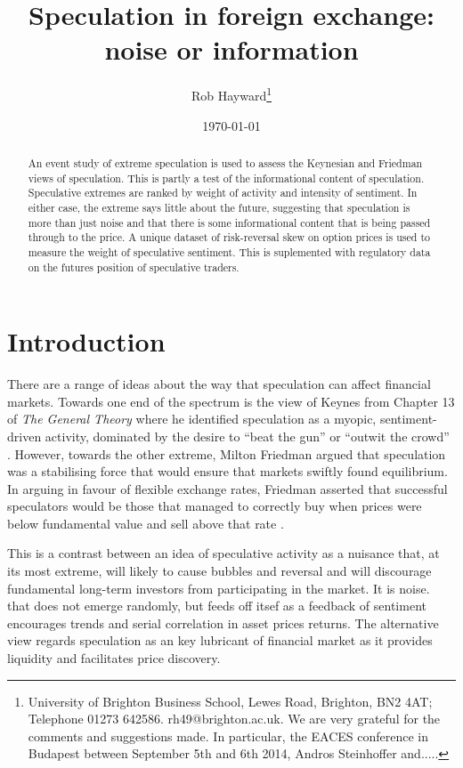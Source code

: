 \documentclass[12pt, a4paper, oneside]{article} %
\begin{document}
\title{Speculation in foreign exchange: noise or information}
\author{Rob Hayward\footnote{University of Brighton Business School, Lewes Road, Brighton, BN2 4AT; Telephone 01273 642586.  rh49@brighton.ac.uk.  We are very grateful for the comments and suggestions made.  In particular, the EACES conference in Budapest between September 5th and 6th 2014, Andros Steinhoffer and.....}} 
\date{\today}
\maketitle
\begin{abstract}
An event study of extreme speculation is used to assess the Keynesian and Friedman views of speculation.  This is partly a test of the informational content of speculation.  Speculative extremes are ranked by weight of activity and intensity of sentiment.  In either case, the extreme says little about the future, suggesting that speculation is more than just noise and that there is some informational content that is being passed through to the price. A unique dataset of risk-reversal skew on option prices is used to measure the weight of speculative sentiment.  This is suplemented with regulatory data on the futures position of speculative traders.  
\end{abstract}

\section{Introduction}

There are a range of ideas about the way that speculation can affect financial markets.  Towards one end of the spectrum is the view of Keynes from Chapter 13 of \emph{The General Theory} where he identified speculation as a myopic, sentiment-driven activity, dominated by the desire to ``beat the gun'' or  ``outwit the crowd'' \citep[p. 101]{Keynes1936}.  However, towards the other extreme, Milton Friedman argued that speculation was a stabilising force that would ensure that markets swiftly found equilibrium. In arguing in favour of flexible exchange rates, Friedman asserted that successful speculators would be those that managed to correctly buy when prices  were below fundamental value and sell above that rate \citep{FriedmanPositive}. 

This is a contrast between an idea of speculative activity as a nuisance that, at its most extreme, will likely to cause bubbles and reversal and will discourage fundamental long-term investors from participating in the market.  It is noise.   that does not emerge randomly, but feeds off itsef as a feedback of sentiment  encourages  trends and serial correlation in asset prices returns.  The alternative view regards speculation as an key lubricant of financial market as it provides liquidity and facilitates price discovery.  
\end{document}
